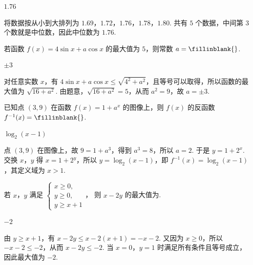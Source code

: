 \begin{answer}
\(1.76\)
\end{answer}

\begin{solution}
将数据按从小到大排列为 \(1.69\)，\(1.72\)，\(1.76\)，\(1.78\)，\(1.80\). 共有 \(5\) 个数据，中间第 \(3\) 个数就是中位数，因此中位数为 \(1.76\).
\end{solution}

\begin{problem}
若函数 \(f(x)=4\sin x+a\cos x\) 的最大值为 \(5\)，则常数 \(a=\fillinblank{}\).
\end{problem}

\begin{answer}
\(\pm 3\)
\end{answer}

\begin{solution}
对任意实数 \(x\)，有 \(4\sin x+a\cos x\leqslant\sqrt{4^2+a^2}\)，且等号可以取得，所以函数的最大值为 \(\sqrt{16+a^2}\). 由题意，\(\sqrt{16+a^2}=5\)，从而 \(a^2=9\)，故 \(a=\pm3\).
\end{solution}

\begin{problem}
已知点 \((3,9)\) 在函数 \(f(x)=1+a^x\) 的图像上，则 \(f(x)\) 的反函数 \(f^{-1}(x)=\fillinblank{}\).
\end{problem}

\begin{answer}
\(\log_2(x-1)\)
\end{answer}

\begin{solution}
点 \((3,9)\) 在图像上，故 \(9=1+a^3\)，得到 \(a^3=8\)，所以 \(a=2\). 于是 \(y=1+2^x\). 交换 \(x\)，\(y\) 得 \(x=1+2^y\)，所以 \(y=\log_2(x-1)\)，即 \(f^{-1}(x)=\log_2(x-1)\)，其定义域为 \(x>1\).
\end{solution}

\begin{problem}
若 \(x\)，\(y\) 满足
\(\begin{cases}
x\ge0,\\
y\ge0,\\
y\ge x+1
\end{cases}\)，
则 \(x-2y\) 的最大值为\fillinblank{}.
\end{problem}

\begin{answer}
\(-2\)
\end{answer}

\begin{solution}
由 \(y\geqslant x+1\)，有 \(x-2y\leqslant x-2(x+1)=-x-2\). 又因为 \(x\geqslant0\)，所以 \(-x-2\leqslant-2\)，从而 \(x-2y\leqslant-2\). 当 \(x=0\)，\(y=1\) 时满足所有条件且等号成立，因此最大值为 \(-2\).
\end{solution}

